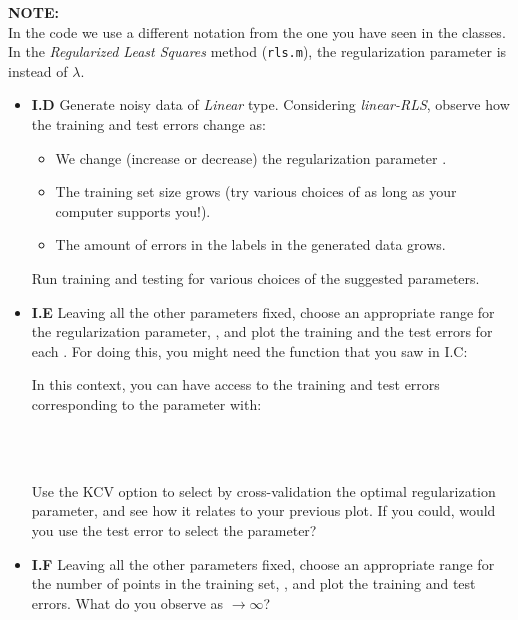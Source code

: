 \documentclass[DIN, pagenumber=false, fontsize=11pt, parskip=half]{scrartcl}
\begin{document}
\begin{framed}
\textbf{NOTE:} \\
In the code we use a different notation from the one you have seen in the classes. In the \emph{Regularized Least Squares} method (\texttt{rls.m}), the regularization parameter is  instead of $\lambda$.
\end{framed}
\begin{itemize}

	\item \textbf{I.D} Generate noisy data of \emph{Linear} type. Considering \emph{linear-RLS}, observe how the training and test errors change as:
	
\begin{itemize}
  \item We change (increase or decrease) the regularization parameter .
  \item The training set size grows (try various choices of  as long as your computer supports you!).
  \item The amount of errors in the labels in the generated data grows.
\end{itemize}
Run training and testing for various choices of the suggested parameters.

	\item \textbf{I.E} Leaving all the other parameters fixed, choose an appropriate range for the regularization parameter, , and plot the training and the test errors for each . 
For doing this, you might need the function  that you saw in I.C:


In this context, you can have access to the training and test errors corresponding to the parameter  with:

\\
\\


	
	Use the KCV option to select by cross-validation the optimal regularization parameter, and see how it relates to your previous plot.
	If you could, would you use the test error to select the parameter?
	
	\item \textbf{I.F} Leaving all the other parameters fixed, choose an appropriate range for the number of points in the training set, \mcode{nval=[n\_min:} \mcode{n\_step:n\_max]},  and plot the training and test errors.
	 What do you observe as  $\rightarrow \infty$? 
\end{itemize}
\end{document}
